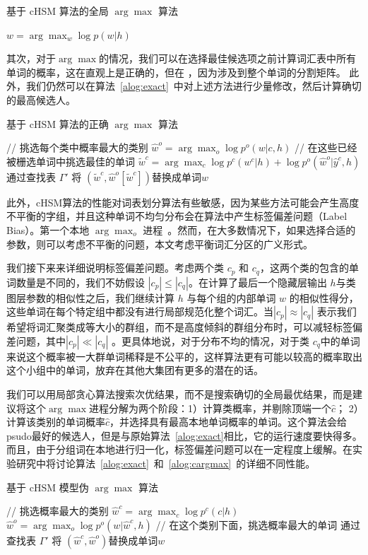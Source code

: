 \begin{algorithm}[!ht]
\caption{基于 cHSM 算法的全局 $\arg\max$ 算法}\label{algo:alls}
 {$w=\arg\max_w \log p(w|h)$}\;
\end{algorithm}

其次，对于$\arg\max $的情况，我们可以在选择最佳候选项之前计算词汇表中所有单词的概率，这在直观上是正确的，但在
，因为涉及到整个单词的分割矩阵。 此外，我们仍然可以在算法~\ref{alog:exact}~中对上述方法进行少量修改，然后计算确切的最高候选人。
\begin{algorithm}[!t]
\caption{基于 cHSM 算法的正确 $\arg\max$ 算法}\label{alog:exact}
{// 挑选每个类中概率最大的类别}\;
 {$\hat w^o=\arg\max_o{\log p^o(w| c,h)}$ }\;
 {// 在这些已经被栅选单词中挑选最佳的单词}
 {$\tilde w^c=\arg\max_c{\log p^c(w^c|h)+\log p^o(\hat w^o|\hat y^c,h)}$}\;
通过查找表 $\Gamma'$ 将 $(\tilde w^c,\hat w^o[\tilde w^c])$替换成单词$w$ \;
\end{algorithm}


此外，cHSM算法的性能对词表划分算法有些敏感，因为某些方法可能会产生高度不平衡的字组，并且这种单词不均匀分布会在算法中产生标签偏差问题（Label Bias）。第一个本地 $\arg\max_o$ 进程~。然而，在大多数情况下，如果选择合适的参数，则可以考虑不平衡的问题，本文考虑平衡词汇分区的广义形式。

我们接下来来详细说明标签偏差问题。考虑两个类 $ c_p $ 和 $ c_q $，这两个类的包含的单词数量是不同的，我们不妨假设 $| c_p | \le | c_q |$。在计算了最后一个隐藏层输出 $h$与类图层参数的相似性之后，我们继续计算 $h$ 与每个组的内部单词 $w$ 的相似性得分，这些单词在每个特定组中都没有进行局部规范化整个词汇。当$ | c_p | \approx|c_q|$ 表示我们希望将词汇聚类成等大小的群组，而不是高度倾斜的群组分布时，可以减轻标签偏差问题，其中$ | c_p | \ll | c_q | $ 。更具体地说，对于分布不均的情况，对于类 $ c_q $中的单词来说这个概率被一大群单词稀释是不公平的，这样算法更有可能以较高的概率取出这个小组中的单词，放弃在其他大集团有更多的潜在的话。

我们可以用局部贪心算法搜索次优结果，而不是搜索确切的全局最优结果，而是建议将这个$ \arg\max $进程分解为两个阶段：1）计算类概率，并剔除顶端一个$ \hat c $； 2）计算该类别的单词概率$ \hat c $，并选择具有最高本地单词概率的单词。这个算法会给psudo最好的候选人，但是与原始算法~\ref{alog:exact}相比，它的运行速度要快得多。而且，由于分组词在本地进行归一化，标签偏差问题可以在一定程度上缓解。在实验研究中将讨论算法~\ref{alog:exact}~和~\ref{alog:cargmax}~的详细不同性能。
\begin{algorithm}[!t]
 \caption{基于 cHSM 模型伪 $\arg\max$ 算法}\label{alog:cargmax}
{// 挑选概率最大的类别}\;
 {$\hat w^c=\arg\max_c{\log p^c(c|h)}$ }\;
 {$\hat w^o=\arg\max_o{\log p^o(w|\hat w^c,h)}$}\;
 {// 在这个类别下面，挑选概率最大的单词}\;
 {通过查找表 $\Gamma'$ 将 $(\hat w^c,\hat w^o)$替换成单词$w$ }\;
\end{algorithm}

